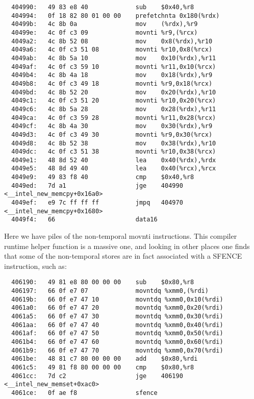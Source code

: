 {{\begin{lstlisting}
  404990:   49 83 e8 40             sub    $0x40,%r8  
  404994:   0f 18 82 80 01 00 00    prefetchnta 0x180(%rdx)  
  40499b:   4c 8b 0a                mov    (%rdx),%r9  
  40499e:   4c 0f c3 09             movnti %r9,(%rcx)  
  4049a2:   4c 8b 52 08             mov    0x8(%rdx),%r10  
  4049a6:   4c 0f c3 51 08          movnti %r10,0x8(%rcx)  
  4049ab:   4c 8b 5a 10             mov    0x10(%rdx),%r11  
  4049af:   4c 0f c3 59 10          movnti %r11,0x10(%rcx)  
  4049b4:   4c 8b 4a 18             mov    0x18(%rdx),%r9  
  4049b8:   4c 0f c3 49 18          movnti %r9,0x18(%rcx)  
  4049bd:   4c 8b 52 20             mov    0x20(%rdx),%r10  
  4049c1:   4c 0f c3 51 20          movnti %r10,0x20(%rcx)  
  4049c6:   4c 8b 5a 28             mov    0x28(%rdx),%r11  
  4049ca:   4c 0f c3 59 28          movnti %r11,0x28(%rcx)  
  4049cf:   4c 8b 4a 30             mov    0x30(%rdx),%r9  
  4049d3:   4c 0f c3 49 30          movnti %r9,0x30(%rcx)  
  4049d8:   4c 8b 52 38             mov    0x38(%rdx),%r10  
  4049dc:   4c 0f c3 51 38          movnti %r10,0x38(%rcx)  
  4049e1:   48 8d 52 40             lea    0x40(%rdx),%rdx  
  4049e5:   48 8d 49 40             lea    0x40(%rcx),%rcx  
  4049e9:   49 83 f8 40             cmp    $0x40,%r8  
  4049ed:   7d a1                   jge    404990 <__intel_new_memcpy+0x16a0>  
  4049ef:   e9 7c ff ff ff          jmpq   404970 <__intel_new_memcpy+0x1680>  
  4049f4:   66                      data16  
\end{lstlisting}

Here we have piles of the non-temporal movnti instructions.  This compiler runtime helper function is a massive one, and looking in other places one finds that some of the non-temporal stores are in fact associated with a SFENCE instruction, such as:

\begin{lstlisting} 
  406190:   49 81 e8 80 00 00 00    sub    $0x80,%r8  
  406197:   66 0f e7 07             movntdq %xmm0,(%rdi)  
  40619b:   66 0f e7 47 10          movntdq %xmm0,0x10(%rdi)  
  4061a0:   66 0f e7 47 20          movntdq %xmm0,0x20(%rdi)  
  4061a5:   66 0f e7 47 30          movntdq %xmm0,0x30(%rdi)  
  4061aa:   66 0f e7 47 40          movntdq %xmm0,0x40(%rdi)  
  4061af:   66 0f e7 47 50          movntdq %xmm0,0x50(%rdi)  
  4061b4:   66 0f e7 47 60          movntdq %xmm0,0x60(%rdi)  
  4061b9:   66 0f e7 47 70          movntdq %xmm0,0x70(%rdi)  
  4061be:   48 81 c7 80 00 00 00    add    $0x80,%rdi  
  4061c5:   49 81 f8 80 00 00 00    cmp    $0x80,%r8  
  4061cc:   7d c2                   jge    406190 <__intel_new_memset+0xac0>  
  4061ce:   0f ae f8                sfence 
\end{lstlisting} 

}}

